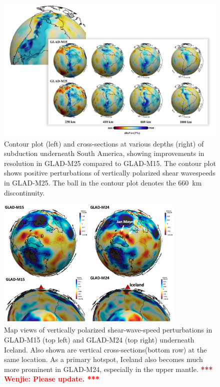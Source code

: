 \documentclass[extra,mreferee]{gji}
\newcommand{\red}[1]{\textbf{\textcolor{Red}{#1}}}
\newcommand{\towenjie}[1]{\textbf{\red{*** Wenjie: #1 ***}}}
\begin{document}
\begin{figure}
\centering
\includegraphics[width=.8\textwidth]{figures/south_america.pdf}
\caption{\small{Contour plot (left) and cross-sections at various depths (right) of subduction underneath South America, showing improvements in resolution in GLAD-M25 compared to GLAD-M15.
The contour plot shows positive perturbations of vertically polarized shear wavespeeds in GLAD-M25. The ball in the contour plot denotes the 660~km discontinuity.}}
\label{fig:S_America}
\end{figure}

\begin{figure}
  \centering
  \includegraphics[width=0.8\textwidth]{./figures/M24-Iceland.png}
  \caption{\small{Map views of vertically polarized shear-wave-speed perturbations in GLAD-M15 (top left) and GLAD-M24 (top right) underneath Iceland. Also shown are vertical cross-sections(bottom row) at the same location. As a primary hotspot, Iceland also becomes much more prominent in GLAD-M24, especially in the upper mantle. \towenjie{Please update.}
  }}
  \label{fig:M24-Iceland}
\end{figure}
\end{document}
